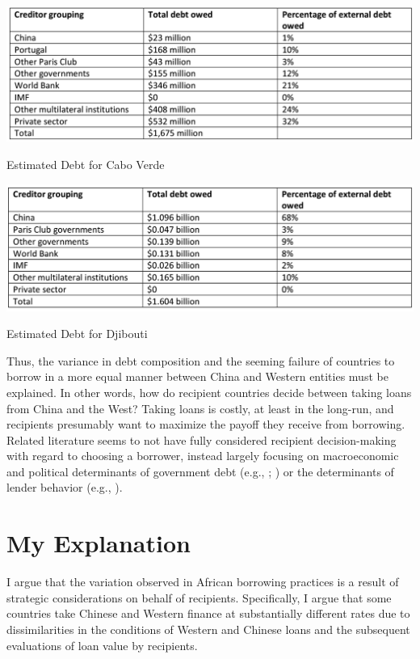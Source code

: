 \documentclass[12pt]{article}
\begin{document}
\begin{table}
    \centering
    \includegraphics[scale=0.5]{Figures/CaboVerde.png}
    \caption{Estimated Debt for Cabo Verde}
    \vspace{1cm}
    \includegraphics[scale=0.5025]{Figures/Djibouti.png}
    \caption{Estimated Debt for Djibouti}
\end{table}

Thus, the variance in debt composition and the seeming failure of countries to borrow in a more equal manner between China and Western entities must be explained. In other words, how do recipient countries decide between taking loans from China and the West? Taking loans is costly, at least in the long-run, and recipients presumably want to maximize the payoff they receive from borrowing. Related literature seems to not have fully considered recipient decision-making with regard to choosing a borrower, instead largely focusing on macroeconomic and political determinants of government debt (e.g., \cite{bittencourt2015} ; \cite{swamy2015}) or the determinants of lender behavior (e.g., \cite{dreher2018}).

\section*{My Explanation}
I argue that the variation observed in African borrowing practices is a result of strategic considerations on behalf of recipients. Specifically, I argue that some countries take Chinese and Western finance at substantially different rates due to dissimilarities in the conditions of Western and Chinese loans and the subsequent evaluations of loan value by recipients.
\end{document}
